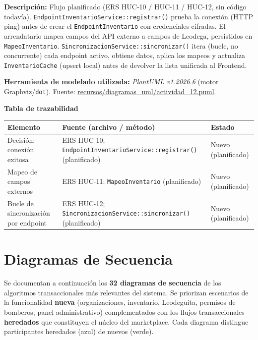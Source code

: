 {\sloppy\noindent\textbf{Descripción:} Flujo planificado (ERS HUC-10 / HUC-11 / HUC-12, sin código todavía). \texttt{EndpointInventarioService::registrar()} prueba la conexión (HTTP ping) antes de crear el \texttt{EndpointInventario} con credenciales cifradas. El arrendatario mapea campos del API externo a campos de Leodega, persistidos en \texttt{MapeoInventario}. \texttt{SincronizacionService::sincronizar()} itera (bucle, no concurrente) cada endpoint activo, obtiene datos, aplica los mapeos y actualiza \texttt{InventarioCache} (upsert local) antes de devolver la lista unificada al Frontend.\par}

\bigskip
{\sloppy\noindent\textbf{Herramienta de modelado utilizada:} \textit{PlantUML v1.2026.6} (motor Graphviz/\texttt{dot}). Fuente: \url{recursos/diagramas_uml/actividad_12.puml}.\par}

\bigskip
\noindent\textbf{Tabla de trazabilidad}
\begin{longtable}{|L{4cm}|L{7.5cm}|M{2.3cm}|}
\hline
{} \textbf{Elemento} & \textbf{Fuente (archivo / método)} & \textbf{Estado} \\ \hline
\endhead
Decisión: conexión exitosa & ERS HUC-10; \texttt{EndpointInventarioService::registrar()} (planificado) & Nuevo (planificado) \\ \hline
Mapeo de campos externos & ERS HUC-11; \texttt{MapeoInventario} (planificado) & Nuevo (planificado) \\ \hline
Bucle de sincronización por endpoint & ERS HUC-12; \texttt{SincronizacionService::sincronizar()} (planificado) & Nuevo (planificado) \\ \hline
\end{longtable}
\clearpage

\section{Diagramas de Secuencia}
\label{sec:secuencia}
\noindent Se documentan a continuación los \textbf{32 diagramas de secuencia} de los algoritmos transaccionales más relevantes del sistema. Se priorizan escenarios de la funcionalidad \textbf{nueva} (organizaciones, inventario, Leodeguita, permisos de bomberos, panel administrativo) complementados con los flujos transaccionales \textbf{heredados} que constituyen el núcleo del marketplace. Cada diagrama distingue participantes heredados (\colorbox{heredadobg}{azul}) de nuevos (\colorbox{nuevobg}{verde}).

